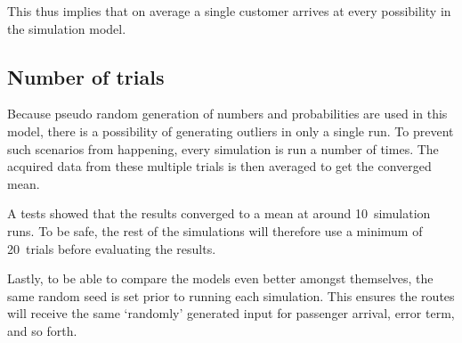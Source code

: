 This thus implies that on average a single customer arrives at every possibility in the simulation model.


\subsection{Number of trials}
Because pseudo random generation of numbers and probabilities are used in this model, there is a possibility of generating outliers in only a single run. To prevent such scenarios from happening, every simulation is run a number of times. The acquired data from these multiple trials is then averaged to get the converged mean.

A tests showed that the results converged to a mean at around 10~simulation runs. To be safe, the rest of the simulations will therefore use a minimum of 20~trials before evaluating the results.

Lastly, to be able to compare the models even better amongst themselves, the same random seed is set prior to running each simulation. This ensures the routes will receive the same `randomly' generated input for passenger arrival, error term, and so forth.



